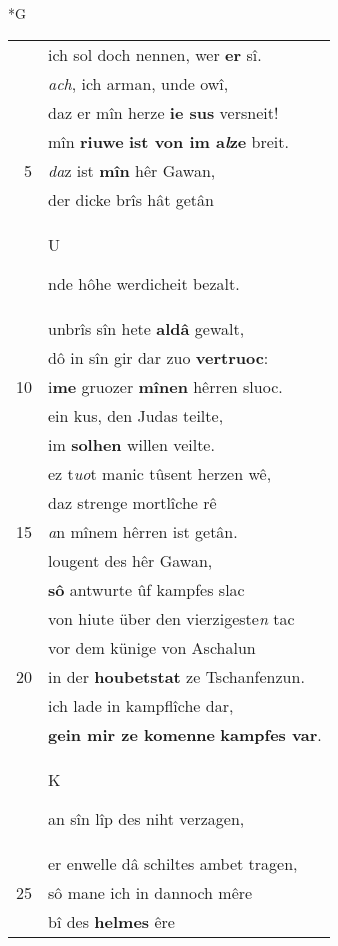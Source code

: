 \documentclass[8pt,a4paper,notitlepage]{article}
\begin{document}
\begin{table}[ht]
\begin{minipage}[t]{0.5\linewidth}
\small
\begin{center}*G
\end{center}
\begin{tabular}{rl}
 & ich sol doch nennen, wer \textbf{er} sî.\\ 
 & \textit{ach}, ich arman, unde owî,\\ 
 & daz er mîn herze \textbf{ie sus} versneit!\\ 
 & mîn \textbf{riuwe} \textbf{ist von im a\textit{l}ze} breit.\\ 
5 & \textit{da}z ist \textbf{mîn} hêr Gawan,\\ 
 & der dicke brîs hât getân\\ 
 & \begin{large}U\end{large}nde hôhe werdicheit bezalt.\\ 
 & unbrîs sîn hete \textbf{aldâ} gewalt,\\ 
 & dô in sîn gir dar zuo \textbf{vertruoc}:\\ 
10 & i\textbf{me} gruozer \textbf{mînen} hêrren sluoc.\\ 
 & ein kus, den Judas teilte,\\ 
 & im \textbf{solhen} willen veilte.\\ 
 & ez t\textit{uo}t manic tûsent herzen wê,\\ 
 & daz strenge mortlîche rê\\ 
15 & \textit{a}n mînem hêrren ist getân.\\ 
 & lougent des hêr Gawan,\\ 
 & \textbf{sô} antwurte ûf kampfes slac\\ 
 & von hiute über den vierzigeste\textit{n} tac\\ 
 & vor dem künige von Aschalun\\ 
20 & in der \textbf{houbetstat} ze Tschanfenzun.\\ 
 & ich lade in kampflîche dar,\\ 
 & \textbf{gein mir ze komenne} \textbf{kampfes var}.\\ 
 & \begin{large}K\end{large}an sîn lîp des niht verzagen,\\ 
 & er enwelle dâ schiltes ambet tragen,\\ 
25 & sô mane ich in dannoch mêre\\ 
 & bî des \textbf{helmes} êre\\ 

\end{tabular}
\end{minipage}
\end{table}
\end{document}
